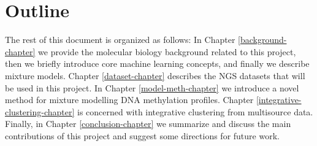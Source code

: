 \section{Outline} \label{outline-intro-l}
The rest of this document is organized as follows: In Chapter \ref{background-chapter} we provide the molecular biology background related to this project, then we briefly introduce core machine learning concepts, and finally we describe mixture models. Chapter \ref{dataset-chapter} describes the NGS datasets that will be used in this project. In Chapter \ref{model-meth-chapter} we introduce a novel method for mixture modelling DNA methylation profiles. Chapter \ref{integrative-clustering-chapter} is concerned with integrative clustering from multisource data. Finally, in Chapter \ref{conclusion-chapter} we summarize and discuss the main contributions of this project and suggest some directions for future work.